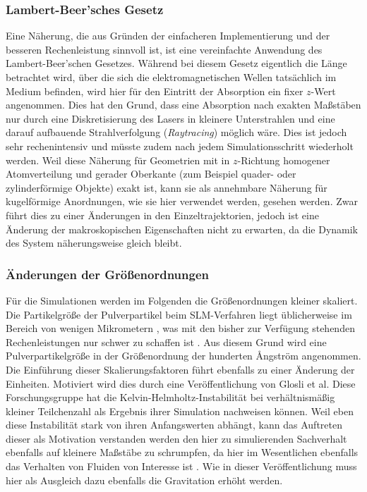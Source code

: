 		\subsubsection{Lambert-Beer'sches Gesetz}
		Eine Näherung, die aus Gründen der einfacheren Implementierung und der besseren
		Rechenleistung sinnvoll ist, ist eine vereinfachte Anwendung des Lambert-Beer'schen
		Gesetzes. Während bei diesem Gesetz eigentlich die Länge betrachtet wird, über die sich
		die elektromagnetischen Wellen tatsächlich im Medium befinden, wird hier für den Eintritt
		der Absorption ein fixer $z$-Wert angenommen. Dies hat den Grund, dass eine Absorption
		nach exakten Maßstäben nur durch eine Diskretisierung des Lasers in kleinere Unterstrahlen
		und eine darauf aufbauende Strahlverfolgung (\emph{Raytracing}) möglich wäre. Dies ist
		jedoch sehr rechenintensiv und müsste zudem nach jedem Simulationsschritt wiederholt
		werden. Weil diese Näherung für Geometrien mit in $z$-Richtung homogener Atomverteilung
		und gerader Oberkante (zum Beispiel quader- oder zylinderförmige Objekte) exakt ist, kann
		sie als annehmbare Näherung für kugelförmige Anordnungen, wie sie hier verwendet werden,
		gesehen werden. Zwar führt dies zu einer Änderungen in den Einzeltrajektorien, jedoch ist
		eine Änderung der makroskopischen Eigenschaften nicht zu erwarten, da die Dynamik des
		System näherungsweise gleich bleibt.

		\subsubsection{Änderungen der Größenordnungen}
		Für die Simulationen werden im Folgenden die Größenordnungen kleiner skaliert. Die
		Partikelgröße der Pulverpartikel beim SLM-Verfahren liegt üblicherweise im Bereich von
		wenigen Mikrometern \cite{hajnys2020research}, was mit den bisher zur Verfügung stehenden
		Rechenleistungen nur schwer zu schaffen ist \cite{eckhardt2013scientists}. Aus diesem
		Grund wird eine Pulverpartikelgröße in der Größenordnung der hunderten \AA ngström
		angenommen. Die Einführung dieser Skalierungsfaktoren führt ebenfalls zu einer Änderung
		der Einheiten. Motiviert wird dies durch eine Veröffentlichung von Glosli et al. Diese
		Forschungsgruppe hat die Kelvin-Helmholtz-Instabilität bei verhältnismäßig kleiner
		Teilchenzahl als Ergebnis ihrer Simulation nachweisen können. Weil eben diese Instabilität
		stark von ihren Anfangswerten abhängt, kann das Auftreten dieser als Motivation verstanden
		werden den hier zu simulierenden Sachverhalt ebenfalls auf kleinere Maßstäbe zu
		schrumpfen, da hier im Wesentlichen ebenfalls das Verhalten von Fluiden von Interesse ist
		\cite{glosli2007extending}. Wie in dieser Veröffentlichung muss hier als Ausgleich dazu
		ebenfalls die Gravitation erhöht werden.


